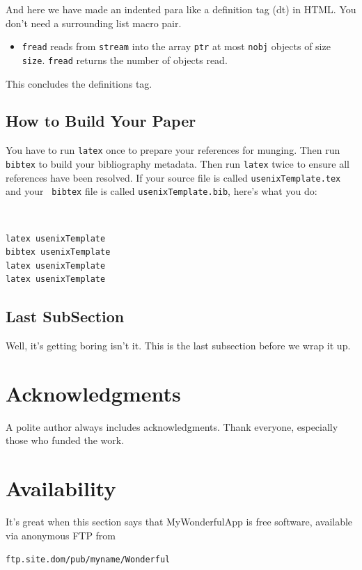 \documentclass[letterpaper,twocolumn,10pt]{article}
\begin{document}
And here we have made an indented para like a definition tag (dt)
in HTML.  You don't need a surrounding list macro pair.
\begin{itemize}
\item[]  {\tt fread} reads from {\tt stream} into the array {\tt ptr} at
most {\tt nobj} objects of size {\tt size}.   {\tt fread} returns
the number of objects read. 
\end{itemize}
This concludes the definitions tag.

\subsection{How to Build Your Paper}

You have to run {\tt latex} once to prepare your references for
munging.  Then run {\tt bibtex} to build your bibliography metadata.
Then run {\tt latex} twice to ensure all references have been resolved.
If your source file is called {\tt usenixTemplate.tex} and your {\tt
  bibtex} file is called {\tt usenixTemplate.bib}, here's what you do:
{\tt \small
\begin{verbatim}
latex usenixTemplate
bibtex usenixTemplate
latex usenixTemplate
latex usenixTemplate
\end{verbatim}
}


\subsection{Last SubSection}

Well, it's getting boring isn't it.  This is the last subsection
before we wrap it up.

\section{Acknowledgments}

A polite author always includes acknowledgments.  Thank everyone,
especially those who funded the work. 

\section{Availability}

It's great when this section says that MyWonderfulApp is free software, 
available via anonymous FTP from

\begin{center}
{\tt ftp.site.dom/pub/myname/Wonderful}\\
\end{center}
\end{document}
